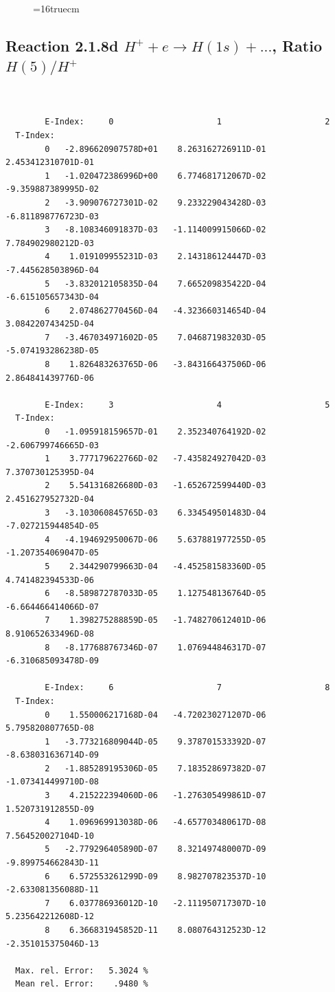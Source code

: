 \documentclass[12pt,dvips]{article}
\begin{document}
\begin{figure} \label{2.1.8rc}
\epsfxsize=16truecm
\end{figure}
\newpage



\subsection{
Reaction 2.1.8d  $H^+ + e \rightarrow H(1s) + ...$,  Ratio $H(5)/H^+$
}

\begin{small}\begin{verbatim}


        E-Index:     0                     1                     2
  T-Index:
        0   -2.896620907578D+01    8.263162726911D-01    2.453412310701D-01
        1   -1.020472386996D+00    6.774681712067D-02   -9.359887389995D-02
        2   -3.909076727301D-02    9.233229043428D-03   -6.811898776723D-03
        3   -8.108346091837D-03   -1.114009915066D-02    7.784902980212D-03
        4    1.019109955231D-03    2.143186124447D-03   -7.445628503896D-04
        5   -3.832012105835D-04    7.665209835422D-04   -6.615105657343D-04
        6    2.074862770456D-04   -4.323660314654D-04    3.084220743425D-04
        7   -3.467034971602D-05    7.046871983203D-05   -5.074193286238D-05
        8    1.826483263765D-06   -3.843166437506D-06    2.864841439776D-06

        E-Index:     3                     4                     5
  T-Index:
        0   -1.095918159657D-01    2.352340764192D-02   -2.606799746665D-03
        1    3.777179622766D-02   -7.435824927042D-03    7.370730125395D-04
        2    5.541316826680D-03   -1.652672599440D-03    2.451627952732D-04
        3   -3.103060845765D-03    6.334549501483D-04   -7.027215944854D-05
        4   -4.194692950067D-06    5.637881977255D-05   -1.207354069047D-05
        5    2.344290799663D-04   -4.452581583360D-05    4.741482394533D-06
        6   -8.589872787033D-05    1.127548136764D-05   -6.664466414066D-07
        7    1.398275288859D-05   -1.748270612401D-06    8.910652633496D-08
        8   -8.177688767346D-07    1.076944846317D-07   -6.310685093478D-09

        E-Index:     6                     7                     8
  T-Index:
        0    1.550006217168D-04   -4.720230271207D-06    5.795820807765D-08
        1   -3.773216809044D-05    9.378701533392D-07   -8.638031636714D-09
        2   -1.885289195306D-05    7.183528697382D-07   -1.073414499710D-08
        3    4.215222394060D-06   -1.276305499861D-07    1.520731912855D-09
        4    1.096969913038D-06   -4.657703480617D-08    7.564520027104D-10
        5   -2.779296405890D-07    8.321497480007D-09   -9.899754662843D-11
        6    6.572553261299D-09    8.982707823537D-10   -2.633081356088D-11
        7    6.037786936012D-10   -2.111950717307D-10    5.235642212608D-12
        8    6.366831945852D-11    8.080764312523D-12   -2.351015375046D-13

  Max. rel. Error:   5.3024 %
  Mean rel. Error:    .9480 %


\end{verbatim}\end{small}
\end{document}
